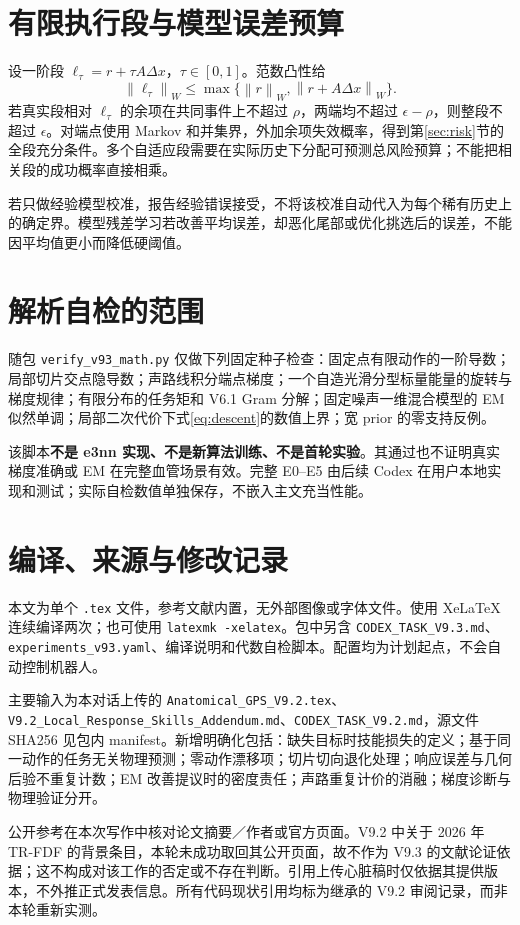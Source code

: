 \documentclass[UTF8,fontset=fandol,11pt,a4paper]{ctexart}
\theoremstyle{plain}
\theoremstyle{definition}
\theoremstyle{remark}
\numberwithin{equation}{section}
\newcommand{\norm}[1]{\left\lVert#1\right\rVert}
\newcommand{\code}[1]{\begingroup\small\nolinkurl{#1}\endgroup}
\begin{document}
\section{有限执行段与模型误差预算}
设一阶段 $\ell_\tau=r+\tau A\Delta x$，$\tau\in[0,1]$。范数凸性给
\[
\norm{\ell_\tau}_W\le\max\{\norm r_W,\norm{r+A\Delta x}_W\}.
\]
若真实段相对 $\ell_\tau$ 的余项在共同事件上不超过 $\rho$，两端均不超过 $\epsilon-\rho$，则整段不超过 $\epsilon$。对端点使用 Markov 和并集界，外加余项失效概率，得到第\ref{sec:risk}节的全段充分条件。多个自适应段需要在实际历史下分配可预测总风险预算；不能把相关段的成功概率直接相乘。

若只做经验模型校准，报告经验错误接受，不将该校准自动代入为每个稀有历史上的确定界。模型残差学习若改善平均误差，却恶化尾部或优化挑选后的误差，不能因平均值更小而降低硬阈值。

\section{解析自检的范围}
\label{app:checks}
随包 \code{verify_v93_math.py} 仅做下列固定种子检查：固定点有限动作的一阶导数；局部切片交点隐导数；声路线积分端点梯度；一个自造光滑分型标量能量的旋转与梯度规律；有限分布的任务矩和 V6.1 Gram 分解；固定噪声一维混合模型的 EM 似然单调；局部二次代价下式\eqref{eq:descent}的数值上界；宽 prior 的零支持反例。

该脚本\textbf{不是 e3nn 实现、不是新算法训练、不是首轮实验}。其通过也不证明真实梯度准确或 EM 在完整血管场景有效。完整 E0--E5 由后续 Codex 在用户本地实现和测试；实际自检数值单独保存，不嵌入主文充当性能。

\section{编译、来源与修改记录}
\label{app:sources}
本文为单个 \code{.tex} 文件，参考文献内置，无外部图像或字体文件。使用 XeLaTeX 连续编译两次；也可使用 \code{latexmk -xelatex}。包中另含 \code{CODEX_TASK_V9.3.md}、\code{experiments_v93.yaml}、编译说明和代数自检脚本。配置均为计划起点，不会自动控制机器人。

主要输入为本对话上传的 \code{Anatomical_GPS_V9.2.tex}、\code{V9.2_Local_Response_Skills_Addendum.md}、\code{CODEX_TASK_V9.2.md}，源文件 SHA256 见包内 manifest\cite{v92,addendum,codex92}。新增明确化包括：缺失目标时技能损失的定义；基于同一动作的任务无关物理预测；零动作漂移项；切片切向退化处理；响应误差与几何后验不重复计数；EM 改善提议时的密度责任；声路重复计价的消融；梯度诊断与物理验证分开。

公开参考在本次写作中核对论文摘要／作者或官方页面。V9.2 中关于 2026 年 TR-FDF 的背景条目，本轮未成功取回其公开页面，故不作为 V9.3 的文献论证依据；这不构成对该工作的否定或不存在判断。引用上传心脏稿时仅依据其提供版本，不外推正式发表信息。所有代码现状引用均标为继承的 V9.2 审阅记录，而非本轮重新实测。
\end{document}
